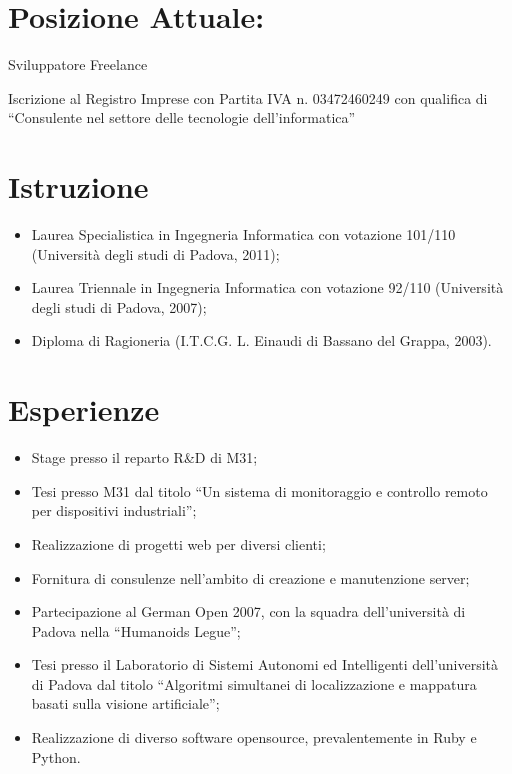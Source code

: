 \documentclass[pdftex, a4paper, 11pt]{article}
\begin{document}
\section*{Posizione Attuale:}


Sviluppatore Freelance

Iscrizione al Registro Imprese con Partita IVA n. 03472460249 con qualifica di ``Consulente nel settore delle tecnologie dell'informatica''


\section*{Istruzione}
\begin{itemize}
\item Laurea Specialistica in Ingegneria Informatica con votazione 101/110 (Universit\`a degli studi di Padova, 2011);
\item Laurea Triennale in Ingegneria Informatica con votazione 92/110 (Universit\`a degli
  studi di Padova, 2007);
\item Diploma di Ragioneria (I.T.C.G. L. Einaudi di Bassano del Grappa,
  2003).
\end{itemize}

\section*{Esperienze}
\begin{itemize}
\item Stage presso il reparto R\&D di M31;
\item Tesi presso M31 dal titolo ``Un sistema di monitoraggio e controllo remoto per dispositivi industriali'';
\item Realizzazione di progetti web per diversi clienti;
\item Fornitura di consulenze nell'ambito di creazione e manutenzione server;
\item Partecipazione al German Open 2007, con la squadra
  dell'universit\`a di Padova nella ``Humanoids Legue'';
\item Tesi presso il Laboratorio di Sistemi Autonomi ed
  Intelligenti dell'universit\`a di Padova dal titolo ``Algoritmi
  simultanei di localizzazione e mappatura basati sulla visione artificiale'';
\item Realizzazione di diverso software opensource,
  prevalentemente in Ruby e Python.
\end{itemize}
\end{document}

